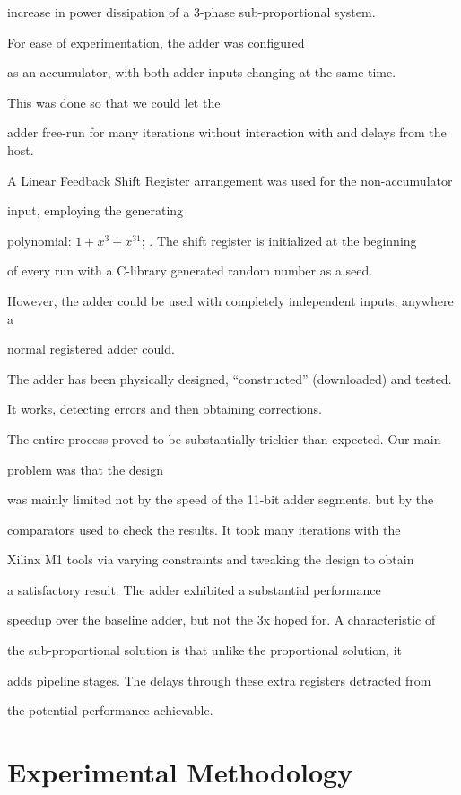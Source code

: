 \documentclass[12pt,dvips]{article}
\begin{document}
increase in power dissipation of a 3-phase sub-proportional system.



For ease of experimentation, the adder was configured

as an accumulator, with both adder inputs changing at the same time.

This was done so that we could let the

adder free-run for many iterations without interaction with and delays from the host.

A Linear Feedback Shift Register arrangement was used for the non-accumulator

input, employing the generating

polynomial: $1 + x^3 + x^{31}$; \cite{McCluskey86}. The shift register is initialized at the beginning

of every run with a C-library generated random number as a seed.

However, the adder could be used with completely independent inputs, anywhere a

normal registered adder could.



The adder has been physically designed, ``constructed'' (downloaded) and tested.

It works, detecting errors and then obtaining corrections.

The entire process proved to be substantially trickier than expected. Our main

problem was that the design

was mainly limited not by the speed of the 11-bit adder segments, but by the

comparators used to check the results. It took many iterations with the

Xilinx M1 tools via varying constraints and tweaking the design to obtain

a satisfactory result. The adder exhibited a substantial performance

speedup over the baseline adder, but not the 3x hoped for. A characteristic of

the sub-proportional solution is that unlike the proportional solution, it

adds pipeline stages. The delays through these extra registers detracted from

the potential performance achievable. 



\section{Experimental Methodology}
\end{document}

